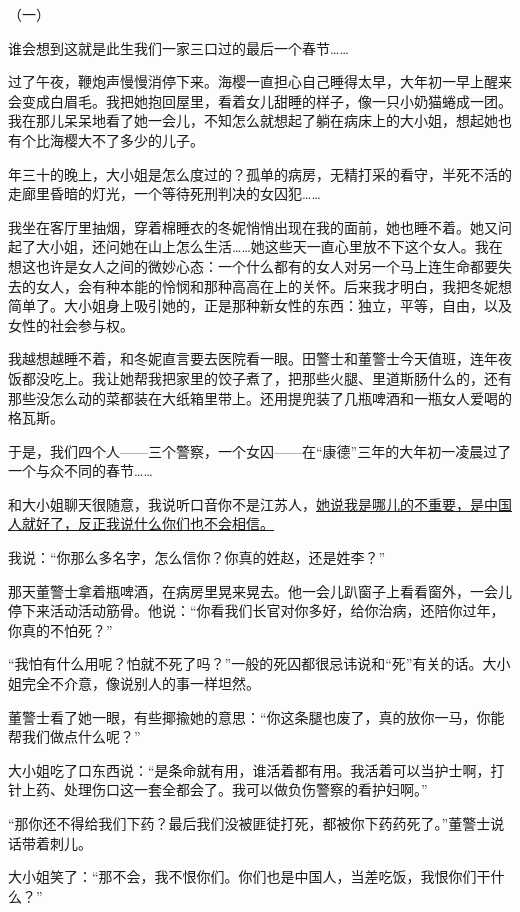 \documentclass[11pt,a4paper]{ctexart}
\begin{document}
\begin{materialtext}
（一）

谁会想到这就是此生我们一家三口过的最后一个春节……

过了午夜，鞭炮声慢慢消停下来。海樱一直担心自己睡得太早，大年初一早上醒来会变成白眉毛。我把她抱回屋里，看着女儿甜睡的样子，像一只小奶猫蜷成一团。我在那儿呆呆地看了她一会儿，不知怎么就想起了躺在病床上的大小姐，想起她也有个比海樱大不了多少的儿子。

年三十的晚上，大小姐是怎么度过的？孤单的病房，无精打采的看守，半死不活的走廊里昏暗的灯光，一个等待死刑判决的女囚犯……

我坐在客厅里抽烟，穿着棉睡衣的冬妮悄悄出现在我的面前，她也睡不着。她又问起了大小姐，还问她在山上怎么生活……她这些天一直心里放不下这个女人。我在想这也许是女人之间的微妙心态：一个什么都有的女人对另一个马上连生命都要失去的女人，会有种本能的怜悯和那种高高在上的关怀。后来我才明白，我把冬妮想简单了。大小姐身上吸引她的，正是那种新女性的东西：独立，平等，自由，以及女性的社会参与权。

我越想越睡不着，和冬妮直言要去医院看一眼。田警士和董警士今天值班，连年夜饭都没吃上。我让她帮我把家里的饺子煮了，把那些火腿、里道斯肠什么的，还有那些没怎么动的菜都装在大纸箱里带上。还用提兜装了几瓶啤酒和一瓶女人爱喝的格瓦斯。

于是，我们四个人——三个警察，一个女囚——在“康德”三年的大年初一凌晨过了一个与众不同的春节……

和大小姐聊天很随意，我说听口音你不是江苏人，\uline{她说我是哪儿的不重要，是中国人就好了，反正我说什么你们也不会相信。}

我说：“你那么多名字，怎么信你？你真的姓赵，还是姓李？”

那天董警士拿着瓶啤酒，在病房里晃来晃去。他一会儿趴窗子上看看窗外，一会儿停下来活动活动筋骨。他说：“你看我们长官对你多好，给你治病，还陪你过年，你真的不怕死？”

“我怕有什么用呢？怕就不死了吗？”一般的死囚都很忌讳说和“死”有关的话。大小姐完全不介意，像说别人的事一样坦然。

董警士看了她一眼，有些揶揄她的意思：“你这条腿也废了，真的放你一马，你能帮我们做点什么呢？”

大小姐吃了口东西说：“是条命就有用，谁活着都有用。我活着可以当护士啊，打针上药、处理伤口这一套全都会了。我可以做负伤警察的看护妇啊。”

“那你还不得给我们下药？最后我们没被匪徒打死，都被你下药药死了。”董警士说话带着刺儿。

大小姐笑了：“那不会，我不恨你们。你们也是中国人，当差吃饭，我恨你们干什么？”


\end{materialtext}
\end{document}
